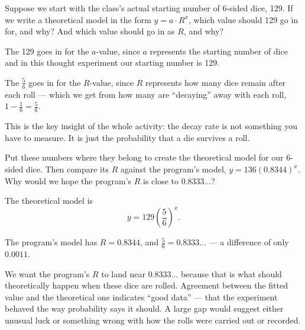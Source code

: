 \documentclass[12pt]{ximera}
\begin{document}
\begin{problem}
Suppose we start with the class's actual starting number of 6-sided dice, 129. If we write
a theoretical model in the form $y = a \cdot R^x$, which value should 129 go in for, and
why? And which value should go in as $R$, and why?

\begin{freeResponse}
\end{freeResponse}

\begin{solution}
The 129 goes in for the $a$-value, since $a$ represents the starting number of dice and in
this thought experiment our starting number is 129.

The $\tfrac{5}{6}$ goes in for the $R$-value, since $R$ represents how many dice remain
after each roll --- which we get from how many are ``decaying'' away with each roll,
$1 - \tfrac{1}{6} = \tfrac{5}{6}$.

This is the key insight of the whole activity: the decay rate is not something you have to
measure. It is just the probability that a die survives a roll.
\end{solution}
\end{problem}

\begin{problem}
Put these numbers where they belong to create the theoretical model for our 6-sided dice.
Then compare its $R$ against the program's model, $y = 136(0.8344)^x$. Why would we
hope the program's $R$ is close to $0.8333\ldots$?

\begin{freeResponse}
\end{freeResponse}

\begin{solution}
The theoretical model is
\[
y = 129 \left(\frac{5}{6}\right)^x.
\]

The program's model has $R = 0.8344$, and $\tfrac{5}{6} = 0.8333\ldots$ --- a difference of
only $0.0011$.

We want the program's $R$ to land near $0.8333\ldots$ because that is what should
theoretically happen when these dice are rolled. Agreement between the fitted value and
the theoretical one indicates ``good data'' --- that the experiment behaved the way
probability says it should. A large gap would suggest either unusual luck or something
wrong with how the rolls were carried out or recorded.
\end{solution}
\end{problem}
\end{document}
